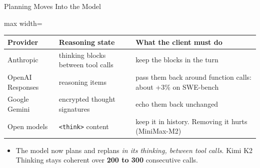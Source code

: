 \begin{frame}{Planning Moves Into the Model}
    \begin{center}
    \small
    \renewcommand{\arraystretch}{1.2}
    \begin{adjustbox}{max width=\linewidth}\begin{tabular}{>{\raggedright\arraybackslash}p{2.6cm}>{\raggedright\arraybackslash}p{4.4cm}>{\raggedright\arraybackslash}p{6.1cm}}
        \toprule
        \textbf{Provider} & \textbf{Reasoning state} & \textbf{What the client must do} \\
        \midrule
        Anthropic & thinking blocks between tool calls & keep the blocks in the turn \\
        OpenAI Responses & reasoning items & pass them back around function calls: about +3\% on SWE-bench \\
        Google Gemini & encrypted thought signatures & echo them back unchanged \\
        Open models & \texttt{<think>} content & keep it in history. Removing it hurts (MiniMax-M2) \\
        \bottomrule
    \end{tabular}\end{adjustbox}
    \end{center}
    \begin{itemize}\itemsep0.3em
        \item The model now plans and replans \emph{in its thinking, between tool calls}. Kimi K2 Thinking stays coherent over \textbf{200 to 300} consecutive calls.
    \end{itemize}
\end{frame}

